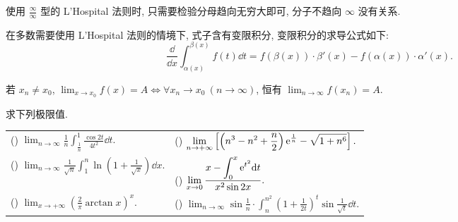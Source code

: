 使用 $\displaystyle\frac{\infty}{\infty}$ 型的 L'Hospital 法则时, 只需要检验分母趋向无穷大即可,
分子不趋向 $\infty$ 没有关系.

在多数需要使用 L'Hospital 法则的情境下, 式子含有变限积分, 变限积分的求导公式如下:
$$\frac{\dd }{\dd x}\int_{\alpha(x)}^{\beta(x)}f(t)\dd t=f(\beta(x))\cdot\beta'(x)-f(\alpha(x))\cdot\alpha'(x).$$

\begin{theorem}[Heine 定理]
    若 $x_n\not=x_0$, $\displaystyle\lim_{x\to x_0}f(x)=A\Leftrightarrow\forall x_n\to x_0~ (n\to\infty)$,
    恒有 $\displaystyle\lim_{n\to\infty}f(x_n)=A.$
\end{theorem}

\begin{example}
    求下列极限值.
    \setcounter{magicrownumbers}{0}
    \begin{table}[H]
        \centering
        \begin{tabular}{l | l}
            (\rownumber{}) $\displaystyle\lim_{n\to\infty}\frac{1}{n}\int_{\frac{1}{n}}^{1}\frac{\cos 2t}{4t^2}\dd t.$              & (\rownumber{}) $\displaystyle\lim_{n\to+\infty}\left[\left(n^3-n^2+\frac{n}{2}\right)\mathrm{e} ^{\frac{1}{n}}-\sqrt{1+n^6}\right].$               \\
            (\rownumber{}) $\displaystyle\lim_{n\to\infty}\frac{1}{\sqrt{n}}\int_{1}^{n}\ln\left(1+\frac{1}{\sqrt{x}}\right)\dd x.$ & (\rownumber{}) $\displaystyle\lim_{x\to0}\frac{\displaystyle x-\int_{0}^{x}\mathrm{e} ^{t^2}\dd t}{x^2\sin2x}.$                                    \\
            (\rownumber{}) $\displaystyle\lim_{x\to +\infty}\left(\frac{2}{\pi}\arctan x\right)^x.$                                 & (\rownumber{}) $\displaystyle\lim_{n\to\infty}\sin\frac{1}{n}\cdot\int_{n}^{n^2}\left(1+\frac{1}{2t}\right)^t\sin\frac{1}{\sqrt{t}}\dd t.$
        \end{tabular}
    \end{table}
\end{example}
